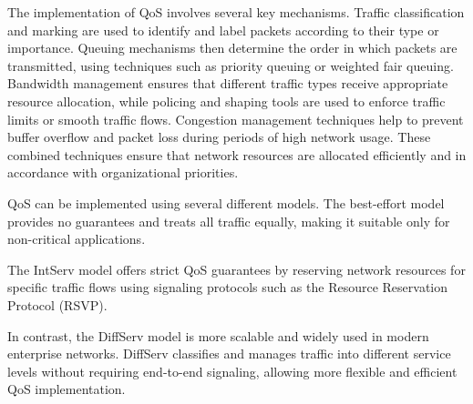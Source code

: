 The implementation of QoS involves several key mechanisms. Traffic classification and marking are used to identify and label packets according to their type or importance. Queuing mechanisms then determine the order in which packets are transmitted, using techniques such as priority queuing or weighted fair queuing. Bandwidth management ensures that different traffic types receive appropriate resource allocation, while policing and shaping tools are used to enforce traffic limits or smooth traffic flows. Congestion management techniques help to prevent buffer overflow and packet loss during periods of high network usage. These combined techniques ensure that network resources are allocated efficiently and in accordance with organizational priorities.\cite{paloalto_networks_what_nodate}\cite{hpe_juniper_networking_what_nodate}\cite{rhim_what_2024}


QoS can be implemented using several different models. The best-effort model provides no guarantees and treats all traffic equally, making it suitable only for non-critical applications.\cite{bruno_wan_2024} 

The \ac{IntServ} model offers strict QoS guarantees by reserving network resources for specific traffic flows using signaling protocols such as the Resource Reservation Protocol (RSVP).\cite{networklessons_introduction_nodate} 

In contrast, the \ac{DiffServ} model is more scalable and widely used in modern enterprise networks. DiffServ classifies and manages traffic into different service levels without requiring end-to-end signaling, allowing more flexible and efficient QoS implementation.\cite{bruno_wan_2024}
